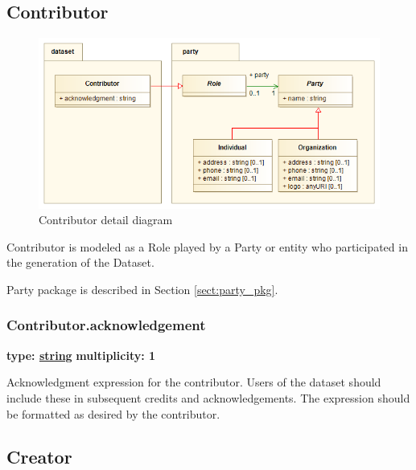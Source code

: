 \subsection{Contributor}
\label{sect:contributor}

  \begin{figure}[h]
  \begin{center}
    \includegraphics[width=4.75in]{diagrams/Contributor.png}
    \caption{Contributor detail diagram}\label{fig:contributor}
  \end{center}
  \end{figure}

  Contributor is modeled as a Role played by a Party or entity who participated
  in the generation of the Dataset.
  
  Party package is described in Section \ref{sect:party_pkg}.

  \subsubsection{Contributor.acknowledgement}
  \textbf{type: \hyperref[sect:ivoa]{string}} \newline
  \textbf{multiplicity: 1} \newline 

  Acknowledgment expression for the contributor. Users of the dataset should
  include these in subsequent credits and acknowledgements. The expression
  should be formatted as desired by the contributor.
  

\pagebreak
\subsection{Creator}
\label{sect:creator}

